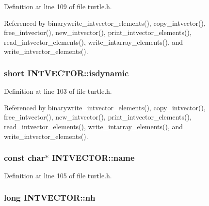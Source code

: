 Definition at line 109 of file turtle.\-h.



Referenced by binarywrite\-\_\-intvector\-\_\-elements(), copy\-\_\-intvector(), free\-\_\-intvector(), new\-\_\-intvector(), print\-\_\-intvector\-\_\-elements(), read\-\_\-intvector\-\_\-elements(), write\-\_\-intarray\-\_\-elements(), and write\-\_\-intvector\-\_\-elements().

\hypertarget{struct_i_n_t_v_e_c_t_o_r_a3b10ef3170cbe7fd5d4ae9d786d690ee}{
\subsubsection[{isdynamic}]{\setlength{\rightskip}{0pt plus 5cm}short I\-N\-T\-V\-E\-C\-T\-O\-R\-::isdynamic}}\label{struct_i_n_t_v_e_c_t_o_r_a3b10ef3170cbe7fd5d4ae9d786d690ee}


Definition at line 103 of file turtle.\-h.



Referenced by binarywrite\-\_\-intvector\-\_\-elements(), copy\-\_\-intvector(), free\-\_\-intvector(), new\-\_\-intvector(), print\-\_\-intvector\-\_\-elements(), read\-\_\-intvector\-\_\-elements(), write\-\_\-intarray\-\_\-elements(), and write\-\_\-intvector\-\_\-elements().

\hypertarget{struct_i_n_t_v_e_c_t_o_r_a64f4d970bc5e48da0f3f6b08824b1b2f}{
\subsubsection[{name}]{\setlength{\rightskip}{0pt plus 5cm}const char$\ast$ I\-N\-T\-V\-E\-C\-T\-O\-R\-::name}}\label{struct_i_n_t_v_e_c_t_o_r_a64f4d970bc5e48da0f3f6b08824b1b2f}


Definition at line 105 of file turtle.\-h.

\hypertarget{struct_i_n_t_v_e_c_t_o_r_a5409e4977d24b6ba944e47d905079dfc}{
\subsubsection[{nh}]{\setlength{\rightskip}{0pt plus 5cm}long I\-N\-T\-V\-E\-C\-T\-O\-R\-::nh}}\label{struct_i_n_t_v_e_c_t_o_r_a5409e4977d24b6ba944e47d905079dfc}


